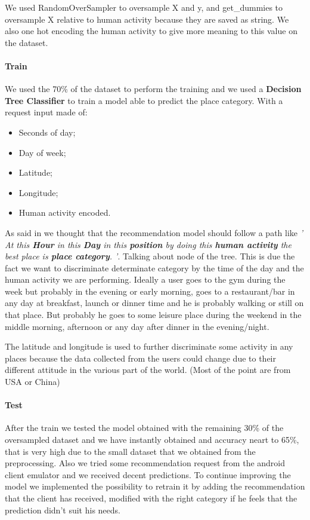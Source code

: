 \documentclass[../../main]{subfiles}
\begin{document}
We used RandomOverSampler to oversample X and y, and get\_dummies to oversample X relative to human activity
because they are saved as string. We also one hot encoding the human activity to give more meaning to this value on the dataset.

\paragraph*{Train}
We used the 70\% of the dataset to perform the training and we used a \textbf{Decision Tree Classifier} to train a model able to
predict the place category. 
With a request input made of:
\begin{itemize}
    \item Seconds of day;
    \item Day of week;
    \item Latitude;
    \item Longitude;
    \item Human activity encoded.
\end{itemize}
As said in  we thought that the recommendation model should follow a path like \textit{' At this \textbf{Hour} in this \textbf{Day} in this \textbf{position} by doing this \textbf{human activity} the best place is \textbf{place category}. '}.
Talking about node of the tree. This is due the fact we want to discriminate determinate category by the time of the day and the human activity we are performing.
Ideally a user goes to the gym during the week but probably in the evening or early morning, 
goes to a restaurant/bar in any day at breakfast, launch or dinner time and he is probably walking or still on that place.
But probably he goes to some leisure place during the weekend in the middle morning, afternoon or any day after dinner in the evening/night.

The latitude and longitude is used to further discriminate some activity in any places because the data collected from the users could change due to their different attitude in the various part of the world.
(Most of the point are from USA or China)
\paragraph*{Test}
After the train we tested the model obtained with the remaining 30\% of the oversampled dataset and we have instantly obtained and accuracy neart to 65\%, that is very high due to the small dataset that we obtained from the preprocessing.
Also we tried some recommendation request from the android client emulator and we received decent predictions. To continue improving the model we implemented the possibility to retrain it by adding the recommendation that the client has received, modified with the right category if he feels that the prediction didn't suit his needs. 
\end{document}
